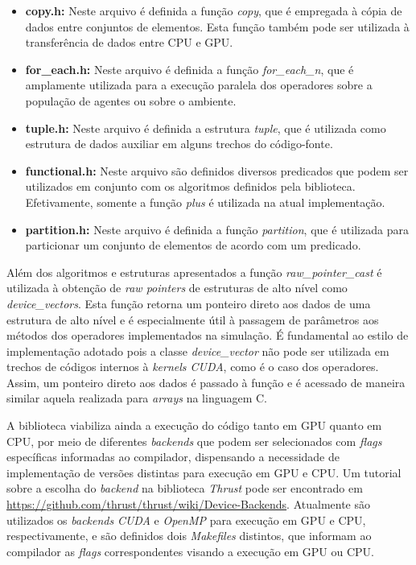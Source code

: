 \begin{itemize}
 \item \textbf{copy.h:} Neste arquivo é definida a função \textit{copy}, que é empregada à cópia de dados entre conjuntos de elementos. Esta função também pode ser utilizada à transferência de dados entre CPU e GPU. 
 \item \textbf{for\_each.h:} Neste arquivo é definida a função \textit{for\_each\_n}, que é amplamente utilizada para a execução paralela dos operadores sobre a população de agentes ou sobre o ambiente. 
 \item \textbf{tuple.h:} Neste arquivo é definida a estrutura \textit{tuple}, que é utilizada como estrutura de dados auxiliar em alguns trechos do código-fonte. 
 \item \textbf{functional.h:} Neste arquivo são definidos diversos predicados que podem ser utilizados em conjunto com os algoritmos definidos pela biblioteca. Efetivamente, somente a função \textit{plus} é utilizada na atual implementação. 
 \item \textbf{partition.h:} Neste arquivo é definida a função \textit{partition}, que é utilizada para particionar um conjunto de elementos de acordo com um predicado. 
\end{itemize}

Além dos algoritmos e estruturas apresentados a função \textit{raw\_pointer\_cast} é utilizada à obtenção de \textit{raw pointers} de estruturas de alto nível como \textit{device\_vectors}. Esta função retorna um ponteiro direto aos dados de uma estrutura de alto nível e é especialmente útil à passagem de parâmetros aos métodos dos operadores implementados na simulação. É fundamental ao estilo de implementação adotado pois a classe \textit{device\_vector} não pode ser utilizada em trechos de códigos internos à \textit{kernels CUDA}, como é o caso dos operadores. Assim, um ponteiro direto aos dados é passado à função e é acessado de maneira similar aquela realizada para \textit{arrays} na linguagem C. 

A biblioteca viabiliza ainda a execução do código tanto em GPU quanto em CPU, por meio de diferentes \textit{backends} que podem ser selecionados com \textit{flags} específicas informadas ao compilador, dispensando a necessidade de implementação de versões distintas para execução em GPU e CPU. Um tutorial sobre a escolha do \textit{backend} na biblioteca \textit{Thrust} pode ser encontrado em \url{https://github.com/thrust/thrust/wiki/Device-Backends}. Atualmente são utilizados os \textit{backends} \textit{CUDA} e \textit{OpenMP} para execução em GPU e CPU, respectivamente, e são definidos dois \textit{Makefiles} distintos, que informam ao compilador as \textit{flags} correspondentes visando a execução em GPU ou CPU. 

